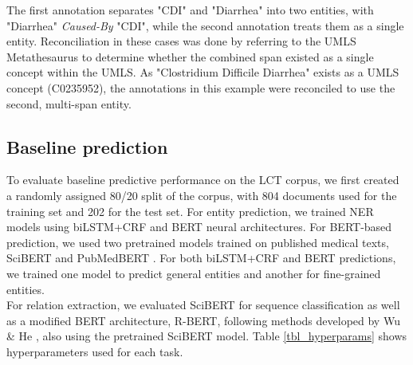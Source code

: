 \documentclass[fleqn,10pt]{wlscirep}
\begin{document}
\noindent The first annotation separates "CDI" and "Diarrhea" into two entities, with "Diarrhea" \textit{Caused-By} "CDI", while the second annotation treats them as a single entity. Reconciliation in these cases was done by referring to the UMLS Metathesaurus to determine whether the combined span existed as a single concept within the UMLS. As "Clostridium Difficile Diarrhea" exists as a UMLS concept (C0235952), the annotations in this example were reconciled to use the second, multi-span entity. 

\subsection*{Baseline prediction}
\noindent To evaluate baseline predictive performance on the LCT corpus, we first created a randomly assigned 80/20 split of the corpus, with 804 documents used for the training set and 202 for the test set. For entity prediction, we trained NER models using biLSTM+CRF and BERT \cite{devlin2018bert} neural architectures. For BERT-based prediction, we used two pretrained models trained on published medical texts, SciBERT \cite{beltagy2019scibert} and PubMedBERT \cite{gu2021domain}. For both biLSTM+CRF and BERT predictions, we trained one model to predict general entities and another for fine-grained entities. \\

\noindent For relation extraction, we evaluated SciBERT for sequence classification as well as a modified BERT architecture, R-BERT, following methods developed by Wu \& He \cite{wu2019enriching}, also using the pretrained SciBERT model. Table \ref{tbl_hyperparams} shows hyperparameters used for each task. \\
\end{document}
